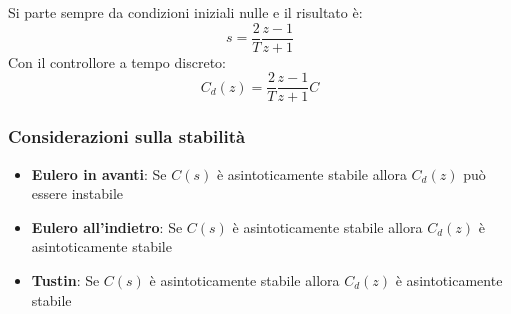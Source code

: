 \begin{definition}
  Si parte sempre da condizioni iniziali nulle e il risultato è:
  \begin{equation}
    s = \frac{2}{T} \frac{z-1}{z+1}
  \end{equation}
  Con il controllore a tempo discreto:
  \begin{equation}
    C_d(z) = \frac{2}{T} \frac{z-1}{z+1} C
  \end{equation}
\end{definition}

\subsubsection{Considerazioni sulla stabilità}

\begin{itemize}
  \item \textbf{Eulero in avanti}: Se $C(s)$ è asintoticamente stabile allora $C_d(z)$ può essere instabile
  \item \textbf{Eulero all'indietro}: Se $C(s)$ è asintoticamente stabile allora $C_d(z)$ è asintoticamente stabile
  \item \textbf{Tustin}: Se $C(s)$ è asintoticamente stabile allora $C_d(z)$ è asintoticamente stabile
\end{itemize}
